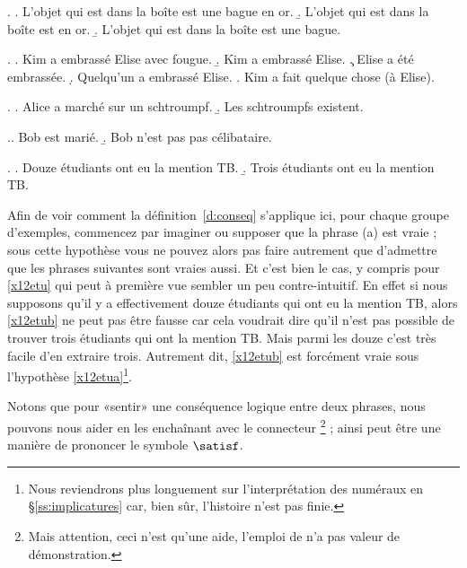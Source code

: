 \begin{refsegment}
\ex.\label{xbag}
\a. L'objet qui est dans la boîte  est une bague en or. \label{xbaga}
\b. L'objet qui est dans la boîte  est en or. \label{xbagb}
\b. L'objet qui est dans la boîte  est une bague. \label{xbagc}

\ex.\label{xkiss}
\a.  Kim a embrassé Elise avec fougue.
\b. Kim a embrassé Elise.
\c. Elise a été embrassée.
\d. Quelqu'un a embrassé Elise.
\e. Kim a fait quelque chose (à Elise).

\ex.
\a.  Alice a marché sur un schtroumpf.
\b. Les schtroumpfs existent.


\ex.\a.  Bob est marié.
\b. Bob n'est pas pas célibataire.

\ex.\label{x12etu}
\a.  Douze étudiants ont eu la mention TB.\label{x12etua}
\b. Trois étudiants ont eu la mention TB.\label{x12etub}


\sloppy 

Afin de voir comment la définition~\ref{d:conseq} s'applique ici, 
pour chaque groupe d'exemples, commencez par imaginer ou supposer que
la phrase (a) est vraie ; sous cette hypothèse vous ne pouvez alors pas faire autrement que
d'admettre que les phrases suivantes sont vraies aussi.  
Et c'est bien le cas, y compris pour \ref{x12etu} qui peut à première vue sembler un peu contre-intuitif.  En effet si nous supposons qu'il y a effectivement douze étudiants qui ont eu la mention TB, alors \ref{x12etub} ne peut pas être fausse car cela voudrait dire qu'il n'est pas possible de trouver trois étudiants qui ont la mention TB. Mais parmi les douze c'est très facile d'en extraire trois.  Autrement dit, \ref{x12etub} est forcément vraie sous l'hypothèse \ref{x12etua}\footnote{Nous reviendrons plus longuement sur l'interprétation des numéraux en \S\ref{ss:implicatures} car, bien sûr, l'histoire n'est pas finie.}. 

\fussy

Notons que pour «sentir» une conséquence logique entre deux
phrases, nous pouvons nous aider en les enchaînant avec le connecteur  \footnote{Mais attention, ceci n'est qu'une aide, l'emploi de  n'a pas
valeur de démonstration.} ; ainsi   peut être une
manière de prononcer le symbole $\satisf$.


\end{refsegment}
